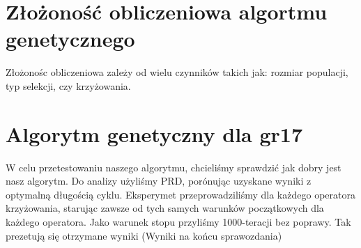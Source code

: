 \documentclass{article}
\begin{document}
    \section{Złożoność obliczeniowa algortmu genetycznego}

    
    Złożonośc obliczeniowa zależy od wielu czynników takich jak:
    rozmiar populacji, typ selekcji, czy krzyżowania.

    \section{Algorytm genetyczny dla gr17}

    W celu przetestowaniu naszego algorytmu, chcieliśmy sprawdzić jak dobry jest
    nasz algorytm. Do analizy użyliśmy PRD, porónując uzyskane wyniki z optymalną długością
    cyklu. Eksperymet przeprowadziliśmy dla każdego operatora krzyżowania, starując zawsze
    od tych samych warunków początkowych dla każdego operatora. Jako warunek stopu przyliśmy 
    1000-teracji bez poprawy. Tak prezetują się otrzymane wyniki (Wyniki na końcu sprawozdania) 
\end{document}
